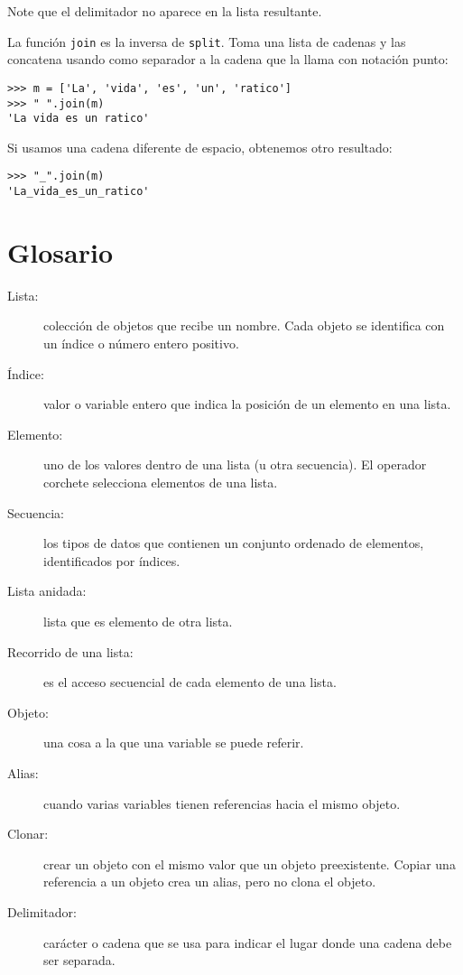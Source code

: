 Note que el delimitador no aparece en la lista resultante.

La función \texttt{join} es la inversa de \texttt{split}. Toma una
lista de cadenas y las concatena usando como separador a la cadena
que la llama con notación punto:
\begin{lstlisting}
>>> m = ['La', 'vida', 'es', 'un', 'ratico']
>>> " ".join(m)
'La vida es un ratico'
\end{lstlisting}

Si usamos una cadena diferente de espacio, obtenemos otro resultado:
\begin{lstlisting}
>>> "_".join(m)
'La_vida_es_un_ratico'
\end{lstlisting}

\section{Glosario}
\begin{description}
\item [{Lista:}] colección de objetos que recibe un nombre. Cada objeto
se identifica con un índice o número entero positivo.
\item [{Índice:}] valor o variable entero que indica la posición de un
elemento en una lista.
\item [{Elemento:}] uno de los valores dentro de una lista (u otra secuencia).
El operador corchete selecciona elementos de una lista.
\item [{Secuencia:}] los tipos de datos que contienen un conjunto ordenado
de elementos, identificados por índices.
\item [{Lista anidada:}] lista que es elemento de otra lista.
\item [{Recorrido de una lista:}] es el acceso secuencial de cada elemento
de una lista.
\item [{Objeto:}] una cosa a la que una variable se puede referir.
\item [{Alias:}] cuando varias variables tienen referencias hacia el mismo
objeto.
\item [{Clonar:}] crear un objeto con el mismo valor que un objeto preexistente.
Copiar una referencia a un objeto crea un alias, pero no clona el
objeto.
\item [{Delimitador:}] carácter o cadena que se usa para indicar el lugar
donde una cadena debe ser separada.

   
  
  
\end{description}

